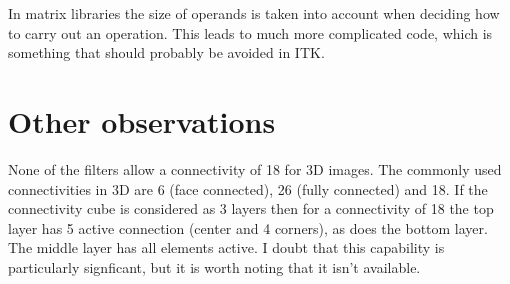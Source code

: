 \documentclass[IJ]{cesj}
\begin{document}
In matrix libraries the size of operands is taken into account when
deciding how to carry out an operation. This leads to much more
complicated code, which is something that should probably be avoided
in ITK.

\section{Other observations}
None of the filters allow a connectivity of 18 for 3D images. The
commonly used connectivities in 3D are 6 (face connected), 26 (fully
connected) and 18. If the connectivity cube is considered as 3 layers
then for a connectivity of 18 the top layer has 5 active connection
(center and 4 corners), as does the bottom layer. The middle layer has
all elements active. I doubt that this capability is particularly
signficant, but it is worth noting that it isn't available.
\end{document}
